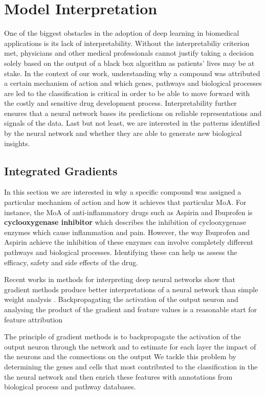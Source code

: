 \documentclass[bsc,frontabs,twoside,singlespacing,parskip,deptreport]{infthesis}     %
\begin{document}
\section{Model Interpretation}
One of the biggest obstacles in the adoption of deep learning in biomedical applications is its lack of interpretability. Without the interpretabiliy criterion met, physicians and other medical professionals cannot justify taking a decision solely based on the output of a black box algorithm as patients' lives may be at stake. In the context of our work, understanding why a compound was attributed a certain mechanism of action and which genes, pathways and biological processes are led to the classification is critical in order to be able to move forward with the costly and sensitive drug development process. Interpretability further ensures that a neural network bases its predictions on reliable representations and signals of the data. Last but not least, we are interested in the patterns identified by the neural network and whether they are able to generate new biological insights.

\subsection{Integrated Gradients}
In this section we are interested in why a specific compound was assigned a particular mechanism of action and how it achieves that particular MoA.
For instance, the MoA of anti-inflammatory drugs such as Aspirin and Ibuprofen is \textbf{cyclooxygenase inhibitor} which describes the inhibition of cyclooxygenase enzymes which cause inflammation and pain. However, the way Ibuprofen and Aspirin achieve the inhibition of these enzymes can involve completely different pathways and biological processes. Identifying these can help us assess the efficacy, safety and side effects of the drug.

Recent works in methods for interpreting deep neural networks show that gradient methods produce better interpretations of a neural network than simple weight analysis \cite{montavon_methods_2018}. Backpropagating the activation of the output neuron and analysing the product of the gradient and feature values is a reasonable start for feature attribution

The principle of gradient methods is to backpropagate the activation of the output neuron through the network and to estimate for each layer the impact of the neurons and the connections on the output
We tackle this problem by determining the genes and cells that most contributed to the classification in the the neural network and then enrich these features with annotations from biological process and pathway databases. 
\end{document}
